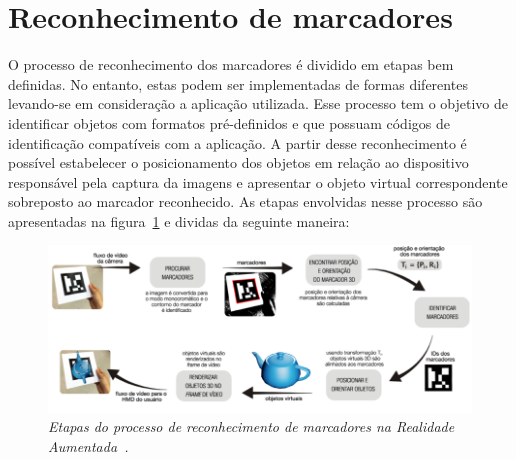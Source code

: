 \section{Reconhecimento de marcadores}
\label{sec:reconhecimentoMarcadores}	
	
		O processo de reconhecimento dos marcadores é dividido em etapas bem definidas. No entanto, estas
		podem ser implementadas de formas diferentes levando-se em consideração a aplicação utilizada.
		Esse processo tem o objetivo de identificar objetos com formatos pré-definidos e que possuam
		códigos de identificação compatíveis com a aplicação. A partir desse
		reconhecimento é possível estabelecer o posicionamento dos objetos em relação ao dispositivo
		responsável pela captura da imagens e apresentar o objeto virtual correspondente sobreposto ao
		marcador reconhecido. As etapas envolvidas nesse processo são apresentadas na
		figura~\ref{fig:pipelineAR} e dividas da seguinte maneira:
		
		\begin{figure}[htb]
			\centering \includegraphics[scale=.55]{figuras/cap2/pipelineAR.png}
			\caption{\textit{Etapas do processo de reconhecimento de marcadores na Realidade
			Aumentada~\cite{fpga}.}}
			\label{fig:pipelineAR} 
		\end{figure}
		
